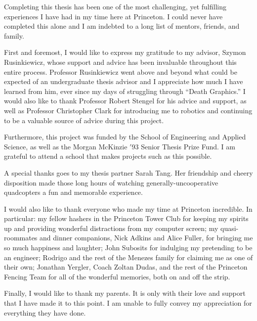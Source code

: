 Completing this thesis has been one of the most challenging, yet fulfilling experiences I have had in my time here at Princeton. I could never have completed this alone and I am indebted to a long list of mentors, friends, and family.

First and foremost, I would like to express my gratitude to my advisor, Szymon Rusinkiewicz, whose support and advice has been invaluable throughout this entire process. Professor Rusinkiewicz went above and beyond what could be expected of an undergraduate thesis advisor and I appreciate how much I have learned from him, ever since my days of struggling through ``Death Graphics.'' I would also like to thank Professor Robert Stengel for his advice and support, as well as Professor Christopher Clark for introducing me to robotics and continuing to be a valuable source of advice during this project.

Furthermore, this project was funded by the School of Engineering and Applied Science, as well as the Morgan McKinzie $'$93 Senior Thesis Prize Fund. I am grateful to attend a school that makes projects such as this possible.

A special thanks goes to my thesis partner Sarah Tang. Her friendship and cheery disposition made those long hours of watching generally-uncooperative quadcopters a fun and memorable experience.

I would also like to thank everyone who made my time at Princeton incredible. In particular: my fellow hashers in the Princeton Tower Club for keeping my spirits up and providing wonderful distractions from my computer screen; my quasi-roommates and dinner companions, Nick Adkins and Alice Fuller, for bringing me so much happiness and laughter; John Subosits for indulging my pretending to be an engineer; Rodrigo and the rest of the Menezes family for claiming me as one of their own; Jonathan Yergler, Coach Zoltan Dudas, and the rest of the Princeton Fencing Team for all of the wonderful memories, both on and off the strip.

Finally, I would like to thank my parents. It is only with their love and support that I have made it to this point. I am unable to fully convey my appreciation for everything they have done.

